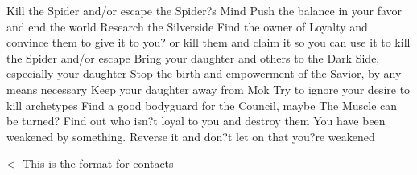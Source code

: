 \documentclass[char]{Silversiders}
\begin{document}
\name{\cDeath{}}

Kill the Spider and/or escape the Spider?s Mind
Push the balance in your favor and end the world
Research the Silverside
Find the owner of Loyalty and convince them to give it to you? or kill them and claim it so you can use it to kill the Spider and/or escape
Bring your daughter and others to the Dark Side, especially your daughter
Stop the birth and empowerment of the Savior, by any means necessary
Keep your daughter away from Mok
Try to ignore your desire to kill archetypes
Find a good bodyguard for the Council, maybe The Muscle can be turned?
Find out who isn?t loyal to you and destroy them
You have been weakened by something. Reverse it and don?t let on that you?re weakened

\begin{itemz}[Goals]
	\item 
\end{itemz}

\begin{itemz}[Notes]
	\item 
\end{itemz}

\begin{contacts}
	\contact{\cTest{}} <- This is the format for contacts 
\end{contacts}
\end{document}
